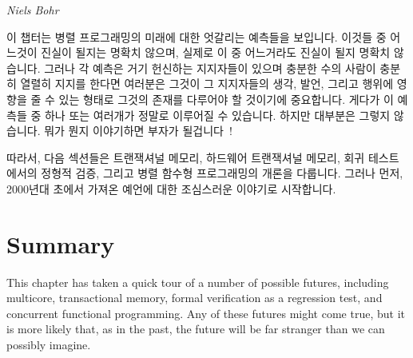 
%
	 {\emph{Niels Bohr}}

이 챕터는 병렬 프로그래밍의 미래에 대한 엇갈리는 예측들을 보입니다.
이것들 중 어느것이 진실이 될지는 명확치 않으며, 실제로 이 중 어느거라도 진실이
될지 명확치 않습니다.
그러나 각 예측은 거기 헌신하는 지지자들이 있으며 충분한 수의 사람이 충분히
열렬히 지지를 한다면 여러분은 그것이 그 지지자들의 생각, 발언, 그리고 행위에
영향을 줄 수 있는 형태로 그것의 존재를 다루어야 할 것이기에 중요합니다.
게다가 이 예측들 중 하나 또는 여러개가 정말로 이루어질 수 있습니다.
하지만 대부분은 그렇지 않습니다.
뭐가 뭔지 이야기하면 부자가 될겁니다~\cite{KeithRSpitz1977}!

따라서, 다음 섹션들은 트랜잭셔널 메모리, 하드웨어 트랜잭셔널 메모리, 회귀
테스트에서의 정형적 검증, 그리고 병렬 함수형 프로그래밍의 개론을 다룹니다.
그러나 먼저, 2000년대 초에서 가져온 예언에 대한 조심스러운 이야기로 시작합니다.

\iffalse

This chapter presents some conflicting visions of the future of parallel
programming.
It is not clear which of these will come to pass, in fact, it is not
clear that any of them will.
They are nevertheless important because each vision has its devoted
adherents, and if enough people believe in something fervently enough,
you will need to deal with that thing's existence in the form of its
influence on the thoughts, words, and deeds of its adherents.
Besides which, one or more of these visions will actually come to pass.
But most are bogus.
Tell which is which and you'll be rich~\cite{KeithRSpitz1977}!

Therefore, the following sections give an overview of transactional
memory, hardware transactional memory,
formal verification in regression testing, and
parallel functional programming.
But first, a cautionary tale on prognostication taken from the early 2000s.

\fi


\IfTwoColumn{}{\FloatBarrier}

\IfTwoColumn{}{\FloatBarrier}




\section{Summary}
\label{sec:future:Summary}

This chapter has taken a quick tour of a number of possible futures,
including multicore, transactional memory, formal verification as
a regression test, and concurrent functional programming.
Any of these futures might come true, but it is more likely that, as in
the past, the future will be far stranger than we can possibly imagine.

